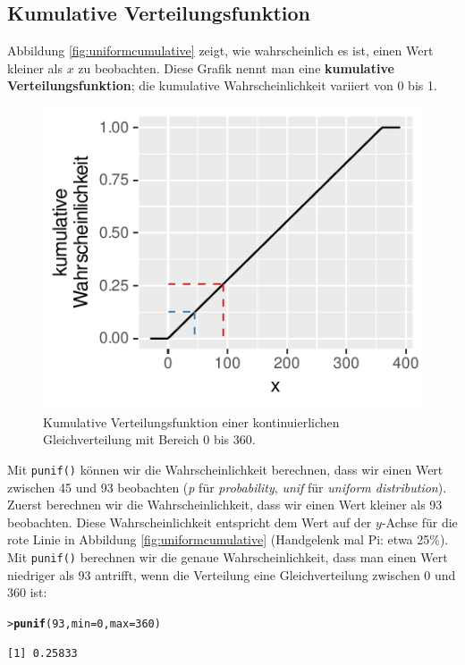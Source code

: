 \documentclass[oneside, 10pt]{book}\usepackage[]{graphicx}\usepackage[]{xcolor}
\makeatletter
\newcommand{\hlnum}[1]{\textcolor[rgb]{0.686,0.059,0.569}{#1}}%
\newcommand{\hlstd}[1]{\textcolor[rgb]{0.345,0.345,0.345}{#1}}%
\newcommand{\hlkwc}[1]{\textcolor[rgb]{0.333,0.667,0.333}{#1}}%
\newcommand{\hlkwd}[1]{\textcolor[rgb]{0.737,0.353,0.396}{\textbf{#1}}}%
\newenvironment{kframe}{%
 \def\at@end@of@kframe{}%
 \ifinner\ifhmode%
  \def\at@end@of@kframe{\end{minipage}}%
  \begin{minipage}{\columnwidth}%
 \fi\fi%
 \def\FrameCommand##1{\hskip\@totalleftmargin \hskip-\fboxsep
 \colorbox{shadecolor}{##1}\hskip-\fboxsep
     \hskip-\linewidth \hskip-\@totalleftmargin \hskip\columnwidth}%
 \MakeFramed {\advance\hsize-\width
   \@totalleftmargin\z@ \linewidth\hsize
   \@setminipage}}%
 {\par\unskip\endMakeFramed%
 \at@end@of@kframe}
\newenvironment{knitrout}{}{} %
\makeatother
\begin{document}
\subsection{Kumulative Verteilungsfunktion}
Abbildung \ref{fig:uniformcumulative} zeigt,
wie wahrscheinlich es ist, einen Wert kleiner als $x$ zu beobachten.
Diese Grafik nennt man eine
\textbf{kumulative Verteilungsfunktion};
die kumulative Wahrscheinlichkeit variiert von 0 bis 1.

\begin{knitrout}
\color{fgcolor}\begin{figure}[tp]

{\centering \includegraphics[width=.33\textwidth]{figs/unnamed-chunk-121-1} 

}

\caption{Kumulative Verteilungsfunktion einer kontinuierlichen Gleichverteilung mit Bereich 0 bis 360.\label{fig:uniformcumulative}}\label{fig:unnamed-chunk-121}
\end{figure}

\end{knitrout}

Mit \texttt{punif()} können wir die Wahrscheinlichkeit
berechnen, dass wir einen Wert zwischen 45 und 93 beobachten
(\textit{p} für \textit{probability},
\textit{unif} für \textit{uniform distribution}).
Zuerst berechnen wir die Wahrscheinlichkeit, dass wir einen
Wert kleiner als 93 beobachten. Diese Wahrscheinlichkeit
entspricht dem Wert auf der $y$-Achse für die rote Linie
in Abbildung \ref{fig:uniformcumulative}
(Handgelenk mal Pi: etwa 25\%). Mit \texttt{punif()} berechnen
wir die genaue Wahrscheinlichkeit, dass man einen Wert
niedriger als 93 antrifft, wenn die Verteilung eine Gleichverteilung
zwischen 0 und 360 ist:
\begin{knitrout}
\color{fgcolor}\begin{kframe}
\begin{alltt}
\hlstd{> }\hlkwd{punif}\hlstd{(}\hlnum{93}\hlstd{,} \hlkwc{min} \hlstd{=} \hlnum{0}\hlstd{,} \hlkwc{max} \hlstd{=} \hlnum{360}\hlstd{)}
\end{alltt}
\begin{verbatim}
[1] 0.25833
\end{verbatim}
\end{kframe}
\end{knitrout}
\end{document}
